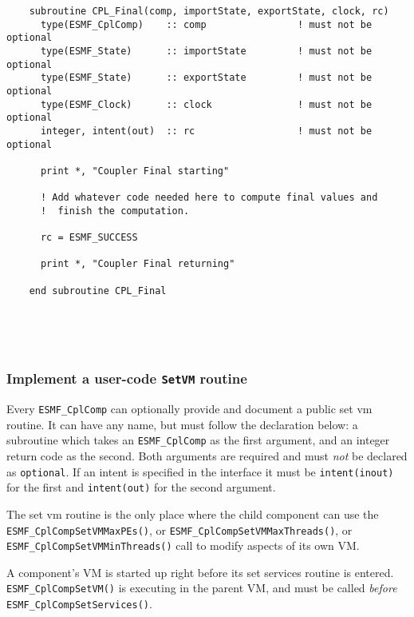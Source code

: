  \begin{verbatim}
    subroutine CPL_Final(comp, importState, exportState, clock, rc)
      type(ESMF_CplComp)    :: comp                ! must not be optional
      type(ESMF_State)      :: importState         ! must not be optional
      type(ESMF_State)      :: exportState         ! must not be optional
      type(ESMF_Clock)      :: clock               ! must not be optional
      integer, intent(out)  :: rc                  ! must not be optional

      print *, "Coupler Final starting"
    
      ! Add whatever code needed here to compute final values and
      !  finish the computation.

      rc = ESMF_SUCCESS

      print *, "Coupler Final returning"
   
    end subroutine CPL_Final

 
\end{verbatim}
 
 
\mbox{}\hrulefill\ 
 

  \subsubsection{Implement a user-code {\tt SetVM} routine}
   
   \label{sec:CplSetVM}
  
   Every {\tt ESMF\_CplComp} can optionally provide and document
   a public set vm routine.  It can have any name, but must
   follow the declaration below: a subroutine which takes an
   {\tt ESMF\_CplComp} as the first argument, and
   an integer return code as the second.
   Both arguments are required and must {\em not} be declared as 
   {\tt optional}. If an intent is specified in the interface it must be 
   {\tt intent(inout)} for the first and {\tt intent(out)} for the 
   second argument.
  
   The set vm routine is the only place where the child component can
   use the {\tt ESMF\_CplCompSetVMMaxPEs()}, or
   {\tt ESMF\_CplCompSetVMMaxThreads()}, or 
   {\tt ESMF\_CplCompSetVMMinThreads()} call to modify aspects of its own VM.
  
   A component's VM is started up right before its set services routine is
   entered. {\tt ESMF\_CplCompSetVM()} is executing in the parent VM, and must
   be called {\em before} {\tt ESMF\_CplCompSetServices()}. 

